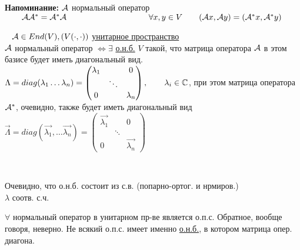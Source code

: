 \documentclass[../main.tex]{subfiles}
\begin{document}
	\textbf{Напоминание: } $\mathcal{A}$ нормальный оператор $\Space \A \A^* = \A^* \A \n 
	\slide{100px} \forall x, y \in V \Space  (\A x, \A y) = (\A^* x, \A^* y)$
	\begin{theorem}\ \n
		$\mathcal{A} \in End(V), (V (\cdot, \cdot))$ \underline{унитарное пространство}\\
		$\mathcal{A}$ нормальный оператор $\Leftrightarrow \exists$ \underline{о.н.б.} $V$ такой, что матрица оператора $\mathcal{A}$ в этом базисе будет иметь диагональный вид.\n 
		$\Lambda = diag(\lambda_1 \ldots \lambda_n) = \begin{pmatrix}
		\lambda_1 & & 0\\
		& \ddots & \\
		0 & & \lambda_n
		\end{pmatrix} , \Space \lambda_i \in \mathbb C$, при этом \n 
		матрица оператора $\mathcal{A}^*$, очевидно, также будет иметь диагональный вид \n $\vec \Lambda = diag (\vec{\lambda_1}, \ldots \vec{\lambda_n}) = \begin{pmatrix}
			\vec{\lambda_1} & & 0 \\
			& \ddots\\0 & & \vec{\lambda_n}
		\end{pmatrix}$
	\end{theorem}
	\begin{remark}
		\ \begin{mylist}
			\item Очевидно, что о.н.б. состоит из с.в. (попарно-ортог. и нрмиров.) \\
			$\lambda$ соотв. с.ч.
			\item $\forall $ нормальный оператор в унитарном пр-ве является о.п.с. Обратное, вообще говоря, неверно. Не всякий о.п.с. имеет именно \underline{о.н.б.}, в котором матрица опер. диагона.
		\end{mylist}
	\end{remark}
\end{document}
